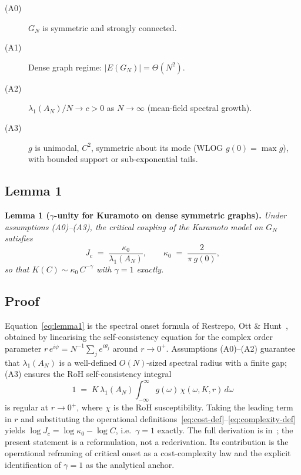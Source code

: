 \begin{description}
\item[(A0)] $G_N$ is symmetric and strongly connected.
\item[(A1)] Dense graph regime: $|E(G_N)| = \Theta(N^2)$.
\item[(A2)] $\lambda_1(A_N)/N \to c > 0$ as $N \to \infty$ (mean-field spectral growth).
\item[(A3)] $g$ is unimodal, $C^2$, symmetric about its mode (WLOG $g(0) = \max g$), with bounded support or sub-exponential tails.
\end{description}

\subsection{Lemma 1}
\label{sec:lemma1-statement}

\textbf{Lemma 1 ($\gamma$-unity for Kuramoto on dense symmetric graphs).}
\emph{Under assumptions (A0)--(A3), the critical coupling of the Kuramoto model on $G_N$ satisfies}
\begin{equation}
J_c \;=\; \frac{\kappa_0}{\lambda_1(A_N)},
\qquad
\kappa_0 \;=\; \frac{2}{\pi\,g(0)},
\label{eq:lemma1}
\end{equation}
\emph{so that $K(C) \sim \kappa_0\,C^{-\gamma}$ with $\gamma = 1$ exactly.}

\subsection{Proof}
\label{sec:lemma1-proof}

Equation~\eqref{eq:lemma1} is the spectral onset formula of Restrepo, Ott \& Hunt~\cite{restrepo2005}, obtained by linearising the self-consistency equation for the complex order parameter $r\,e^{i\psi} = N^{-1}\sum_j e^{i\theta_j}$ around $r \to 0^+$. Assumptions (A0)--(A2) guarantee that $\lambda_1(A_N)$ is a well-defined $O(N)$-sized spectral radius with a finite gap; (A3) ensures the RoH self-consistency integral
\begin{equation}
1 \;=\; K\,\lambda_1(A_N) \int_{-\infty}^{\infty} g(\omega)\,\chi(\omega, K, r)\,d\omega
\end{equation}
is regular at $r \to 0^+$, where $\chi$ is the RoH susceptibility. Taking the leading term in $r$ and substituting the operational definitions~\eqref{eq:cost-def}--\eqref{eq:complexity-def} yields $\log J_c = \log \kappa_0 - \log C$, i.e.\ $\gamma = 1$ exactly. The full derivation is in~\cite{restrepo2005}; the present statement is a reformulation, not a rederivation. Its contribution is the operational reframing of critical onset as a cost-complexity law and the explicit identification of $\gamma = 1$ as the analytical anchor.

